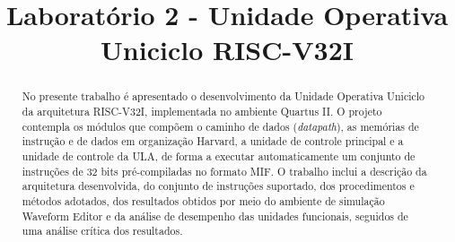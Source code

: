 \documentclass[conference]{IEEEtran}
\begin{document}
\title{Laboratório 2 - Unidade Operativa Uniciclo RISC-V32I\\}

\author{
\and
{}
\and
{}
\and
{}
\and
{}
}

\maketitle

\begin{abstract}
No presente trabalho é apresentado o desenvolvimento da Unidade Operativa Uniciclo da arquitetura
RISC-V32I, implementada no ambiente Quartus II. O projeto contempla os módulos que compõem o caminho de
dados (\textit{datapath}), as memórias de instrução e de dados em organização Harvard, a unidade de
controle principal e a unidade de controle da ULA, de forma a executar automaticamente um conjunto de
instruções de 32 bits pré-compiladas no formato MIF. O trabalho inclui a descrição da arquitetura
desenvolvida, do conjunto de instruções suportado, dos procedimentos e métodos adotados, dos resultados
obtidos por meio do ambiente de simulação Waveform Editor e da análise de desempenho das unidades
funcionais, seguidos de uma análise crítica dos resultados.
\end{abstract}
\end{document}
